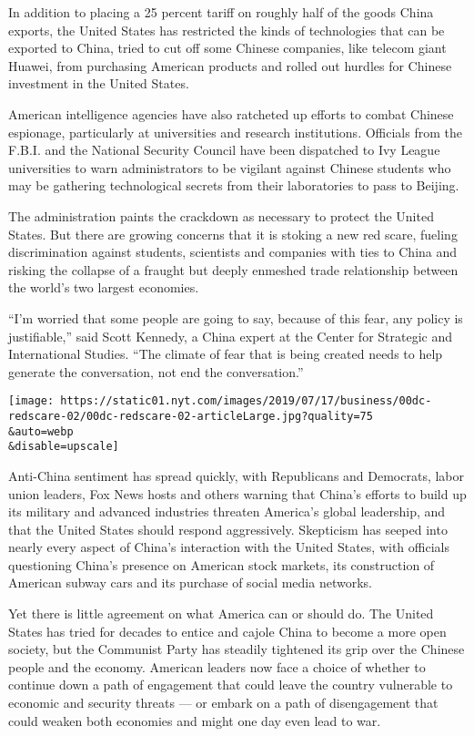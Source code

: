 In addition to placing a 25 percent tariff on roughly half of the goods
China exports, the United States has restricted the kinds of
technologies that can be exported to China, tried to cut off some
Chinese companies, like telecom giant Huawei, from purchasing American
products and rolled out hurdles for Chinese investment in the United
States.

American intelligence agencies have also ratcheted up efforts to combat
Chinese espionage, particularly at universities and research
institutions. Officials from the F.B.I. and the National Security
Council have been dispatched to Ivy League universities to warn
administrators to be vigilant against Chinese students who may be
gathering technological secrets from their laboratories to pass to
Beijing.

The administration paints the crackdown as necessary to protect the
United States. But there are growing concerns that it is stoking a new
red scare, fueling discrimination against students, scientists and
companies with ties to China and risking the collapse of a fraught but
deeply enmeshed trade relationship between the world's two largest
economies.

``I'm worried that some people are going to say, because of this fear,
any policy is justifiable,'' said Scott Kennedy, a China expert at the
Center for Strategic and International Studies. ``The climate of fear
that is being created needs to help generate the conversation, not end
the conversation.''

\texttt{[image: https://static01.nyt.com/images/2019/07/17/business/00dc-redscare-02/00dc-redscare-02-articleLarge.jpg?quality=75\\\&auto=webp\\\&disable=upscale]}

Anti-China sentiment has spread quickly, with Republicans and Democrats,
labor union leaders, Fox News hosts and others warning that China's
efforts to build up its military and advanced industries threaten
America's global leadership, and that the United States should respond
aggressively. Skepticism has seeped into nearly every aspect of China's
interaction with the United States, with officials questioning China's
presence on American stock markets, its construction of American subway
cars and its purchase of social media networks.

Yet there is little agreement on what America can or should do. The
United States has tried for decades to entice and cajole China to become
a more open society, but the Communist Party has steadily tightened its
grip over the Chinese people and the economy. American leaders now face
a choice of whether to continue down a path of engagement that could
leave the country vulnerable to economic and security threats --- or
embark on a path of disengagement that could weaken both economies and
might one day even lead to war.

